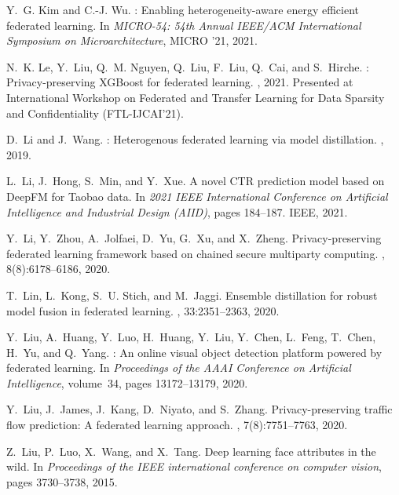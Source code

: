\documentclass{article}
\begin{document}
\begin{thebibliography}{10}
Y.~G. Kim and C.-J. Wu.
: Enabling heterogeneity-aware energy efficient federated
  learning.
\newblock In {\em MICRO-54: 54th Annual IEEE/ACM International Symposium on
  Microarchitecture}, MICRO '21, 2021.

N.~K. Le, Y.~Liu, Q.~M. Nguyen, Q.~Liu, F.~Liu, Q.~Cai, and S.~Hirche.
: Privacy-preserving {XGBoost} for federated learning.
, 2021.
\newblock Presented at International Workshop on Federated and Transfer
  Learning for Data Sparsity and Confidentiality (FTL-IJCAI'21).

D.~Li and J.~Wang.
: Heterogenous federated learning via model distillation.
, 2019.

L.~Li, J.~Hong, S.~Min, and Y.~Xue.
\newblock A novel {CTR} prediction model based on {DeepFM} for {T}aobao data.
\newblock In {\em 2021 IEEE International Conference on Artificial Intelligence
  and Industrial Design (AIID)}, pages 184--187. IEEE, 2021.

Y.~Li, Y.~Zhou, A.~Jolfaei, D.~Yu, G.~Xu, and X.~Zheng.
\newblock Privacy-preserving federated learning framework based on chained
  secure multiparty computing.
, 8(8):6178--6186, 2020.

T.~Lin, L.~Kong, S.~U. Stich, and M.~Jaggi.
\newblock Ensemble distillation for robust model fusion in federated learning.
,
  33:2351--2363, 2020.

Y.~Liu, A.~Huang, Y.~Luo, H.~Huang, Y.~Liu, Y.~Chen, L.~Feng, T.~Chen, H.~Yu,
  and Q.~Yang.
: An online visual object detection platform powered by
  federated learning.
\newblock In {\em Proceedings of the AAAI Conference on Artificial
  Intelligence}, volume~34, pages 13172--13179, 2020.

Y.~Liu, J.~James, J.~Kang, D.~Niyato, and S.~Zhang.
\newblock Privacy-preserving traffic flow prediction: A federated learning
  approach.
, 7(8):7751--7763, 2020.

Z.~Liu, P.~Luo, X.~Wang, and X.~Tang.
\newblock Deep learning face attributes in the wild.
\newblock In {\em Proceedings of the IEEE international conference on computer
  vision}, pages 3730--3738, 2015.


\end{thebibliography}
\end{document}
